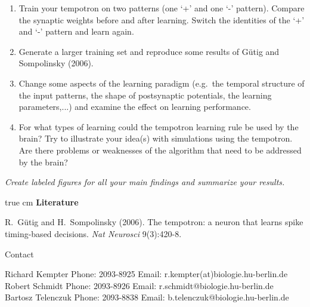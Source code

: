 \documentclass[12pt]{article}
\begin{document}
\begin{enumerate}
  \item Train your tempotron on two patterns (one `+' and one `-'
  pattern). Compare the synaptic weights before and after learning.
  Switch the identities of the `+' and `-' pattern and learn again.
  
  \item Generate a larger training set and reproduce some results of
  G\"utig and Sompolinsky (2006).

  \item Change some aspects of the learning paradigm (e.g.~the
  temporal structure of the input patterns, the shape of postsynaptic
  potentials, the learning parameters,...) and examine the effect on
  learning performance.

  \item For what types of learning could the tempotron learning rule
  be used by the brain? Try to illustrate your idea(s) with
  simulations using the tempotron. Are there problems or weaknesses of
  the algorithm that need to be addressed by the brain?

\end{enumerate}
\textit{Create labeled figures for all your main findings
    and summarize your results.}

 true cm
{\bf Literature} 

\noindent R.~G\"utig and H.~Sompolinsky (2006). The tempotron: a neuron that
learns spike timing-based decisions. \emph{Nat Neurosci} 9(3):420-8.



\vfill
\centerline{\CAP Contact} \CAP

Richard Kempter \hfill Phone: 2093-8925 \hfill
Email: r.kempter(at)biologie.hu-berlin.de \\
Robert Schmidt \hfill Phone: 2093-8926 \hfill
Email: r.schmidt@biologie.hu-berlin.de \\
Bartosz Telenczuk \hfill Phone: 2093-8838 \hfill
Email: b.telenczuk@biologie.hu-berlin.de \\
\end{document}
